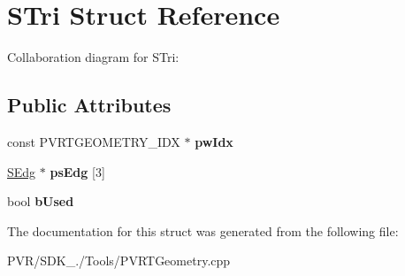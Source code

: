 \hypertarget{struct_s_tri}{\section{S\+Tri Struct Reference}
\label{struct_s_tri}
}


Collaboration diagram for S\+Tri\+:
\subsection*{Public Attributes}
\begin{DoxyCompactItemize}
\item 
\hypertarget{struct_s_tri_a6df2498faafddbb019f6b4082375cc12}{const P\+V\+R\+T\+G\+E\+O\+M\+E\+T\+R\+Y\+\_\+\+I\+D\+X $\ast$ {\bfseries pw\+Idx}}\label{struct_s_tri_a6df2498faafddbb019f6b4082375cc12}

\item 
\hypertarget{struct_s_tri_aea213990f249900e4e634d7c4c8ee315}{\hyperlink{struct_s_edg}{S\+Edg} $\ast$ {\bfseries ps\+Edg} \mbox{[}3\mbox{]}}\label{struct_s_tri_aea213990f249900e4e634d7c4c8ee315}

\item 
\hypertarget{struct_s_tri_ae46736a2c56238abad3ff6dec4ceaf76}{bool {\bfseries b\+Used}}\label{struct_s_tri_ae46736a2c56238abad3ff6dec4ceaf76}

\end{DoxyCompactItemize}


The documentation for this struct was generated from the following file\+:\begin{DoxyCompactItemize}
\item 
P\+V\+R/\+S\+D\+K\+\_./\+Tools/P\+V\+R\+T\+Geometry.\+cpp\end{DoxyCompactItemize}

